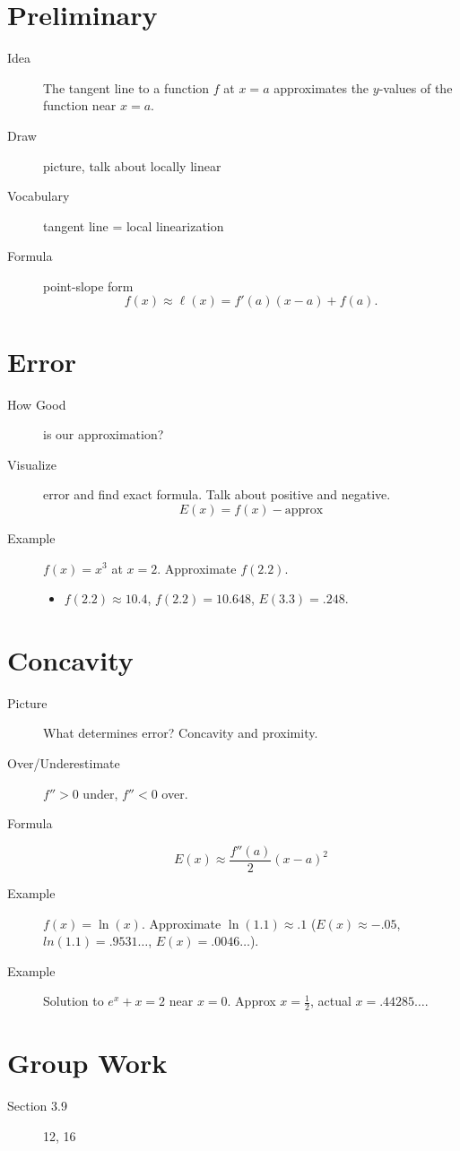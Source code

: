 \documentclass[11pt]{article}
\begin{document}
\drawtitle

\section*{Preliminary}
\begin{description}
\item[Idea] The tangent line to a function $f$ at $x=a$ approximates
  the $y$-values of the function near $x=a$.
\item[Draw] picture, talk about locally linear
\item[Vocabulary] tangent line = local linearization
\item[Formula] point-slope form
  \[
  f(x) \approx \ell(x) = f'(a)(x-a)+f(a).
  \]
\end{description}

\section*{Error}
\begin{description}
\item[How Good] is our approximation?
\item[Visualize] error and find exact formula.  Talk about positive
  and negative.
  \[
  E(x) = f(x) - \text{approx}
  \]
\item[Example] $f(x)=x^3$ at $x=2$.  Approximate $f(2.2)$.
  \begin{itemize}
  \item $f(2.2)\approx 10.4$, $f(2.2)= 10.648$, $E(3.3) = .248$.
  \end{itemize}
\end{description}

\section*{Concavity}
\begin{description}
\item[Picture] What determines error? Concavity and proximity.
\item[Over/Underestimate] $f''>0$ under, $f''<0$ over.
\item[Formula]
  \[
  E(x)\approx\frac{f''(a)}{2}(x-a)^2
  \]
\item[Example] $f(x)=\ln(x)$.  Approximate $\ln(1.1)\approx .1$
  ($E(x)\approx -.05$, $ln(1.1) = .9531\dots$, $E(x) = .0046\dots$).
\item[Example] Solution to $e^x+x=2$ near $x=0$. Approx $x=\frac{1}{2}$, actual $x=.44285\dots$.
\end{description}

\section*{Group Work}
\begin{description}
\item[Section 3.9] 12, 16
\end{description}
\end{document}
